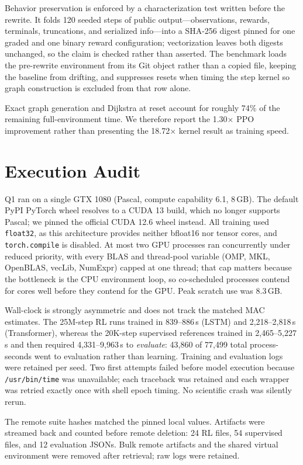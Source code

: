 \documentclass[10pt,twocolumn]{article}
\newcommand{\code}[1]{\texttt{\small #1}}
\begin{document}
Behavior preservation is enforced by a characterization test written before the
rewrite.  It folds 120 seeded steps of public output---observations, rewards,
terminals, truncations, and serialized info---into a SHA-256 digest pinned for
one graded and one binary reward configuration; vectorization leaves both
digests unchanged, so the claim is checked rather than asserted.  The benchmark
loads the pre-rewrite environment from its Git object rather than a copied
file, keeping the baseline from drifting, and suppresses resets when timing the
step kernel so graph construction is excluded from that row alone.

Exact graph generation and Dijkstra at reset account for roughly 74\% of the
remaining full-environment time.  We therefore report the 1.30$\times$ PPO
improvement rather than presenting the 18.72$\times$ kernel result as training
speed.

\section{Execution Audit}

Q1 ran on a single GTX 1080 (Pascal, compute capability 6.1, 8\,GB).  The
default PyPI PyTorch wheel resolves to a CUDA 13 build, which no longer
supports Pascal; we pinned the official CUDA 12.6 wheel instead.  All training
used \code{float32}, as this architecture provides neither bfloat16 nor tensor
cores, and \code{torch.compile} is disabled.  At most two GPU processes ran
concurrently under reduced priority, with every BLAS and thread-pool variable
(OMP, MKL, OpenBLAS, vecLib, NumExpr) capped at one thread; that cap matters
because the bottleneck is the CPU environment loop, so co-scheduled processes
contend for cores well before they contend for the GPU.  Peak scratch use was
8.3\,GB.

Wall-clock is strongly asymmetric and does not track the matched MAC estimates.
The 25M-step RL runs trained in 839--886\,s (LSTM) and 2,218--2,818\,s
(Transformer), whereas the 20K-step supervised references trained in
2,465--5,227\,s and then required 4,331--9,963\,s to \emph{evaluate}: 43,860 of
77,499 total process-seconds went to evaluation rather than learning.  Training
and
evaluation logs were retained per seed.  Two first attempts failed before
model execution because \code{/usr/bin/time} was unavailable; each traceback
was retained and each wrapper was retried exactly once with shell epoch timing.
No scientific crash was silently rerun.

The remote suite hashes matched the pinned local values.  Artifacts were
streamed back and counted before remote deletion: 24 RL files, 54 supervised
files, and 12 evaluation JSONs.  Bulk remote artifacts and the shared virtual
environment were removed after retrieval; raw logs were retained.

{\footnotesize
\setlength{\bibsep}{1.5pt plus 0.3ex}


}
\end{document}
